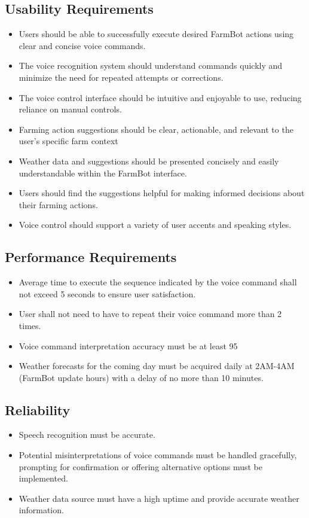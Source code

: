 \subsection{Usability Requirements}
\begin{itemize}
    \item Users should be able to successfully execute desired FarmBot actions using clear and concise voice commands.
    \item The voice recognition system should understand commands quickly and minimize the need for repeated attempts or corrections.
    \item The voice control interface should be intuitive and enjoyable to use, reducing reliance on manual controls.
    \item Farming action suggestions should be clear, actionable, and relevant to the user's specific farm context
    \item Weather data and suggestions should be presented concisely and easily understandable within the FarmBot interface.
    \item Users should find the suggestions helpful for making informed decisions about their farming actions.
    \item Voice control should support a variety of user accents and speaking styles.
\end{itemize}

\subsection{Performance Requirements}
\begin{itemize}
    \item Average time to execute the sequence indicated by the voice command shall not exceed 5 seconds to ensure user satisfaction.
    \item User shall not need to have to repeat their voice command more than 2 times.
    \item Voice command interpretation accuracy must be at least 95%
    \item Weather forecasts for the coming day must be acquired daily at 2AM-4AM (FarmBot update hours) with a delay of no more than 10 minutes.
\end{itemize}

\subsection{Reliability}
\begin{itemize}
    \item Speech recognition must be accurate.
    \item Potential misinterpretations of voice commands must be handled gracefully, prompting for confirmation or offering alternative options must be implemented.
    \item Weather data source must have a high uptime and provide accurate weather information.
\end{itemize}

